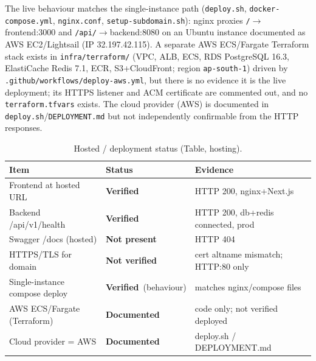 \documentclass[11pt,a4paper]{article}
\newcommand{\stV}{\textcolor{cok}{\textbf{Verified}}}
\newcommand{\stDoc}{\textcolor{cpart}{\textbf{Documented}}}
\newcommand{\stNP}{\textcolor{cmiss}{\textbf{Not present}}}
\newcommand{\stNV}{\textcolor{cnv}{\textbf{Not verified}}}
\newcommand{\code}[1]{\texttt{\small #1}}
\begin{document}
The live behaviour matches the single-instance path (\code{deploy.sh},
\code{docker-compose.yml}, \code{nginx.conf}, \code{setup-subdomain.sh}): nginx proxies
\code{/}$\to$frontend:3000 and \code{/api/}$\to$backend:8080 on an Ubuntu instance
documented as AWS EC2/Lightsail (IP 32.197.42.115). A separate AWS ECS/Fargate Terraform
stack exists in \code{infra/terraform/} (VPC, ALB, ECS, RDS PostgreSQL 16.3, ElastiCache
Redis 7.1, ECR, S3+CloudFront; region \code{ap-south-1}) driven by
\code{.github/workflows/deploy-aws.yml}, but there is no evidence it is the live deployment;
its HTTPS listener and ACM certificate are commented out, and no \code{terraform.tfvars}
exists. The cloud provider (AWS) is documented in \code{deploy.sh}/\code{DEPLOYMENT.md} but
not independently confirmable from the HTTP responses.

\begin{table}[H]\centering\footnotesize
\caption{Hosted / deployment status (Table, hosting).}\label{tab:host}
\begin{tabular}{@{}p{4.6cm}l p{6.4cm}@{}}
\toprule
\textbf{Item} & \textbf{Status} & \textbf{Evidence}\\
\midrule
Frontend at hosted URL & \stV & HTTP 200, nginx+Next.js\\
Backend /api/v1/health & \stV & HTTP 200, db+redis connected, prod\\
Swagger /docs (hosted) & \stNP & HTTP 404\\
HTTPS/TLS for domain & \stNV & cert altname mismatch; HTTP:80 only\\
Single-instance compose deploy & \stV\ (behaviour) & matches nginx/compose files\\
AWS ECS/Fargate (Terraform) & \stDoc & code only; not verified deployed\\
Cloud provider = AWS & \stDoc & deploy.sh / DEPLOYMENT.md\\
\bottomrule
\end{tabular}
\end{table}

\end{document}
